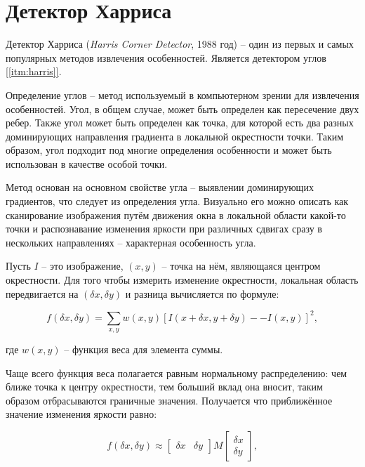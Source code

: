 \section{Детектор Харриса}

Детектор Харриса (\textit{Harris Corner Detector}, 1988 год) -- один из первых и самых популярных методов извлечения особенностей. Является детектором углов \hyperref[itm:harris]{[\ref{itm:harris}]}.

Определение углов -- метод используемый в компьютерном зрении для извлечения особенностей. Угол, в общем случае, может быть определен как пересечение двух ребер. Также угол может быть определен как точка, для которой есть два разных доминирующих направления градиента в локальной окрестности точки. Таким образом, угол подходит под многие определения особенности и может быть использован в качестве особой точки. 

Метод основан на основном свойстве угла -- выявлении доминирующих градиентов, что следует из определения угла. Визуально его можно описать как сканирование изображения путём движения окна в локальной области какой-то точки и распознавание изменения яркости при различных сдвигах сразу в нескольких направлениях -- характерная особенность угла.

Пусть $I$ -- это изображение, $(x, y)$ -- точка на нём, являющаяся центром окрестности. Для того чтобы измерить изменение окрестности, локальная область передвигается на $(\delta x, \delta y)$ и разница вычисляется по формуле:

\begin{equation}
    f(\delta x, \delta y) = \sum_{x, y} w(x, y) [I(x + \delta x, y + \delta y) -- I(x, y)]^2,
\end{equation}

\begin{flushleft}
    где $w(x, y)$ -- функция веса для элемента суммы.
\end{flushleft}

Чаще всего функция веса полагается равным нормальному распределению: чем ближе точка к центру окрестности, тем больший вклад она вносит, таким образом отбрасываются граничные значения. Получается что приближённое значение изменения яркости равно:

\begin{equation}
    f(\delta x, \delta y) \approx \begin{bmatrix} \delta x & \delta y \end{bmatrix} M \begin{bmatrix} \delta x \\ \delta y \end{bmatrix},
\end{equation}

